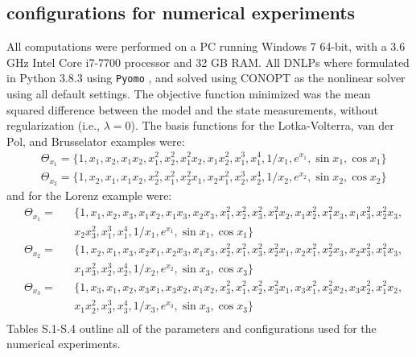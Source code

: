 \documentclass[12pt]{article}
\begin{document}
\clearpage

\subsection[S]{\ours{} configurations for numerical experiments}

All computations were performed on a PC running Windows 7 64-bit, with a 3.6 GHz Intel Core i7-7700 processor and 32 GB RAM. All DNLPs where formulated in Python 3.8.3 using \verb"Pyomo" \cite{hart2017pyomo}, and solved using CONOPT \cite{drud1994conopt} as the nonlinear solver using all default settings.  The objective function minimized was the mean squared difference between the model and the state measurements, without regularization (i.e., $\lambda = 0$). The basis functions for the Lotka-Volterra, van der Pol, and Brusselator examples were:
\begin{equation}
\begin{aligned}
\label{eq:basis_fun_2D}
& \Theta_{x_1} = \{1,x_1,x_2,x_1x_2,x_1^2,x_2^2,x_1^2x_2,x_1x_2^2,x_1^3,x_1^4,1/x_1,e^{x_1}, \sin{x_1}, \cos{x_1} \} \\
& \Theta_{x_2} = \{1,x_2,x_1,x_1x_2,x_2^2,x_1^2,x_2^2x_1,x_2x_1^2,x_2^3,x_2^4,1/x_2,e^{x_2}, \sin{x_2}, \cos{x_2} \}
\end{aligned}
\end{equation}
and for the Lorenz example were:
\begin{equation}
\begin{aligned}
\label{eq:basis_fun_3D}
& \Theta_{x_1} = && \{1,x_1,x_2,x_3,x_1x_2,x_1x_3,x_2x_3, x_1^2, x_2^2, x_3^2, x_1^2x_2, x_1x_2^2, x_1^2x_3, x_1x_3^2, x_2^2x_3,  \\&  && x_2x_3^2, x_1^3, x_1^4, 1/x_1, e^{x_1}, \sin{x_1}, \cos{x_1} \}  \\
& \Theta_{x_2} = && \{1,x_2,x_1,x_3,x_2x_1, x_2x_3, x_1x_3, x_2^2, x_1^2, x_3^2, x_2^2x_1, x_2x_1^2, x_2^2x_3, x_2x_3^2, x_1^2x_3,   \\&  && x_1x_3^2, x_2^3, x_2^4, 1/x_2, e^{x_2}, \sin{x_3}, \cos{x_3} \}  \\
& \Theta_{x_3} = && \{1,x_3,x_1,x_2,x_3x_1, x_3x_2, x_1x_2, x_3^2, x_1^2, x_2^2, x_3^2x_1, x_3x_1^2, x_3^2x_2, x_3x_2^2, x_1^2x_2,   \\&  && x_1x_2^2, x_3^3, x_3^4, 1/x_3, e^{x_3}, \sin{x_3}, \cos{x_3} \}  \\
\end{aligned}
\end{equation}
Tables S.1-S.4 outline all of the \ours{} parameters and configurations used for the numerical experiments.
\end{document}
